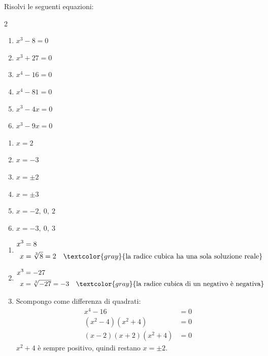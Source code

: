 \begin{question}[ID=4.1, subtitle={Equazioni di grado superiore al secondo}, difficulty=facile, tags={equazioni di grado superiore}]
Risolvi le seguenti equazioni:
\begin{multicols}{2}
\begin{enumerate}[leftmargin=3cm]
    \item $x^3 - 8 = 0$
    \item $x^3 + 27 = 0$
    \item $x^4 - 16 = 0$
    \item $x^4 - 81 = 0$
    \item $x^3 - 4x = 0$
    \item $x^3 - 9x = 0$
\end{enumerate}
\end{multicols}
\begin{solution}
\begin{enumerate}
    \item $x=2$
    \item $x=-3$
    \item $x=\pm2$
    \item $x=\pm3$
    \item $x=-2,\ 0,\ 2$
    \item $x=-3,\ 0,\ 3$
\end{enumerate}
\end{solution}
\begin{explanation}
\begin{enumerate}
    \item \[\begin{aligned}
    x^3 &= 8\\
    x &= \sqrt[3]{8}=2 && \textcolor{gray}{\text{la radice cubica ha una sola soluzione reale}}
    \end{aligned}\]
    \item \[\begin{aligned}
    x^3 &= -27\\
    x &= \sqrt[3]{-27}=-3 && \textcolor{gray}{\text{la radice cubica di un negativo è negativa}}
    \end{aligned}\]
    \item Scompongo come differenza di quadrati:
    \[\begin{aligned}
    x^4-16 &= 0\\
    (x^2-4)(x^2+4) &= 0\\
    (x-2)(x+2)(x^2+4) &= 0
    \end{aligned}\]
    $x^2+4$ è sempre positivo, quindi restano $x=\pm2$.

\end{enumerate}
\end{explanation}
\end{question}
